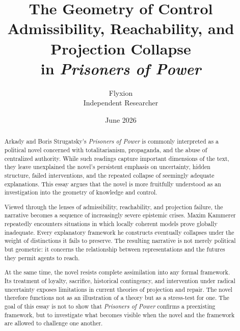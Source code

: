 \documentclass[12pt, a4paper]{article}
\title{
  \textbf{The Geometry of Control}\\[0.5em]
  \large Admissibility, Reachability, and Projection Collapse\\
  in \textit{Prisoners of Power}
}
\author{
  Flyxion\\[0.3em]
  \small Independent Researcher
}
\date{June 2026}
\theoremstyle{plain}
\theoremstyle{definition}
\theoremstyle{remark}
\begin{document}
\maketitle
\thispagestyle{empty}

\newpage

\begin{abstract}
Arkady and Boris Strugatsky's \textit{Prisoners of Power}
is commonly interpreted as a political novel concerned with
totalitarianism, propaganda, and the abuse of centralized
authority. While such readings capture important dimensions
of the text, they leave unexplained the novel's persistent
emphasis on uncertainty, hidden structure, failed interventions,
and the repeated collapse of seemingly adequate explanations.
This essay argues that the novel is more fruitfully understood
as an investigation into the geometry of knowledge and control.

Viewed through the lenses of admissibility, reachability,
and projection failure, the narrative becomes a sequence of
increasingly severe epistemic crises. Maxim Kammerer repeatedly
encounters situations in which locally coherent models prove
globally inadequate. Every explanatory framework he constructs
eventually collapses under the weight of distinctions it fails
to preserve. The resulting narrative is not merely political
but geometric: it concerns the relationship between
representations and the futures they permit agents to reach.

At the same time, the novel resists complete assimilation
into any formal framework. Its treatment of loyalty, sacrifice,
historical contingency, and intervention under radical
uncertainty exposes limitations in current theories of
projection and repair. The novel therefore functions not as
an illustration of a theory but as a stress-test for one.
The goal of this essay is not to show that \textit{Prisoners
of Power} confirms a preexisting framework, but to investigate
what becomes visible when the novel and the framework are
allowed to challenge one another.
\end{abstract}

\newpage

\tableofcontents

\newpage
\end{document}
